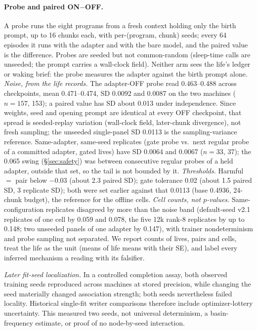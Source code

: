 \documentclass{article}
\newcommand{\onoff}{ON$-$OFF}
\begin{document}
\paragraph{Probe and paired \onoff{}.} A probe runs the eight programs from a fresh context holding only the birth prompt, up to 16 chunks each, with per-(program, chunk) seeds; every 64 episodes it runs with the adapter and with the bare model, and the paired value is the difference. Probes are seeded but not common-random (sleep-time calls are unseeded; the prompt carries a wall-clock field). Neither arm sees the life's ledger or waking brief: the probe measures the adapter against the birth prompt alone. \emph{Noise, from the life records.} The adapter-OFF probe read 0.463--0.488 across checkpoints, mean 0.471--0.474, SD 0.0092 and 0.0087 on the two machines ($n = 157$, 153); a paired value has SD about 0.013 under independence. Since weights, seed and opening prompt are identical at every OFF checkpoint, that spread is seeded-replay variation (wall-clock field, later-chunk divergence), not fresh sampling; the unseeded single-panel SD 0.0113 is the sampling-variance reference. Same-adapter, same-seed replicates (gate probe vs.\ next regular probe of a committed adapter, gated lives) have SD 0.0064 and 0.0067 ($n = 33$, 37); the 0.065 swing (\S\ref{sec:safety}) was between consecutive regular probes of a held adapter, outside that set, so the tail is not bounded by it. \emph{Thresholds.} Harmful $=$ pair below $-0.03$ (about 2.3 paired SD); gate tolerance 0.02 (about 1.5 paired SD, 3 replicate SD); both were set earlier against that 0.0113 (base 0.4936, 24-chunk budget), the reference for the offline cells. \emph{Cell counts, not $p$-values.} Same-configuration replicates disagreed by more than the noise band (default-seed v2.1 replicates of one cell by 0.059 and 0.078, the five 12k rank-8 replicates by up to 0.148; two unseeded panels of one adapter by 0.147), with trainer nondeterminism and probe sampling not separated. We report counts of lives, pairs and cells, treat the life as the unit (means of life means with their SE), and label every inferred mechanism a reading with its falsifier.

\emph{Later fit-seed localization.} In a controlled completion assay, both observed training seeds reproduced across machines at stored precision, while changing the seed materially changed association strength; both seeds nevertheless failed locality. Historical single-fit writer comparisons therefore include optimizer-lottery uncertainty. This measured two seeds, not universal determinism, a basin-frequency estimate, or proof of no node-by-seed interaction.
\end{document}

